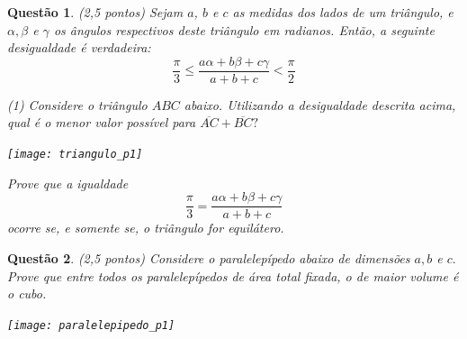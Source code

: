 \documentclass[oneside,a4paper,12pt]{article}
\newcommand{\negrito}[1]{\mbox{\boldmath{$#1$}}}
\theoremstyle{Colorido}
\theoremstyle{solu}
\theoremstyle{dotlessP}
\newtheorem{sol}{Questão}
\begin{document}
\newpage
	\begin{sol}
\textit{(2,5 pontos)} \newline \newline Sejam $a$, $b$ e $c$ as medidas dos lados de um triângulo, e $\alpha, \beta$ e $\gamma$ os ângulos respectivos deste triângulo em radianos. Então, a seguinte desigualdade é verdadeira:
\[ \frac{\pi}{3} \le \frac{a\alpha + b\beta + c\gamma}{a + b + c} < \frac{\pi}{2} \]

\begin{tasks}[counter-format={(tsk[a])},label-width=3.6ex, label-format = {\bfseries}, column-sep = {20pt}](1)
\task[\textcolor{blue}{$\negrito{(a)} $}] Considere o triângulo $ABC$ abaixo. Utilizando a desigualdade descrita acima, qual é o menor valor possível para $\overline{AC} + \overline{BC}?$
\begin{center}
\texttt{[image: triangulo\_p1]}
\end{center}
\task[\textcolor{blue}{$\negrito{(b)} $}] Prove que a igualdade 
\[  \frac{\pi}{3} = \frac{a\alpha + b\beta + c\gamma}{a + b + c} \] ocorre se, e somente se, o triângulo for equilátero. 
\end{tasks}
\end{sol}
\newpage
	\begin{sol}
\textit{(2,5 pontos)} \newline \newline Considere o paralelepípedo abaixo de dimensões $a,b$ e $c.$ Prove que entre todos os paralelepípedos de área total fixada, o de maior volume é o cubo.
\begin{center}
\texttt{[image: paralelepipedo\_p1]}
\end{center}
\end{sol}



		
	

		

		
		
		
		
		
	\flushbottom
	\flushright
\end{document}
